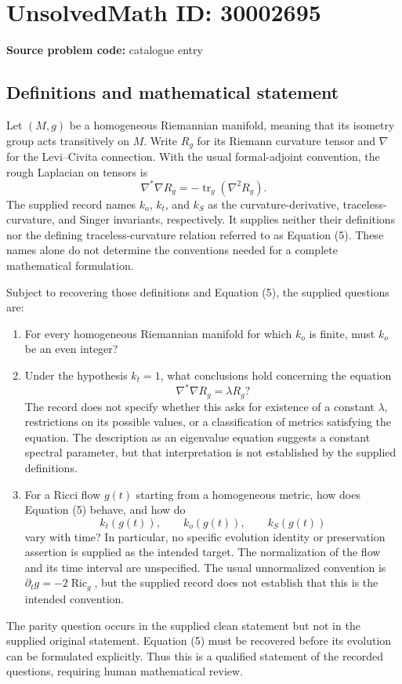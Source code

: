 \documentclass[11pt]{article}
\begin{document}
\section*{UnsolvedMath ID: 30002695}
\textbf{Source problem code:} catalogue entry
\subsection{Definitions and mathematical statement}
Let \((M,g)\) be a homogeneous Riemannian manifold, meaning that its isometry group acts transitively on \(M\). Write \(R_g\) for its Riemann curvature tensor and \(\nabla\) for the Levi--Civita connection. With the usual formal-adjoint convention, the rough Laplacian on tensors is
\[
\nabla^*\nabla R_g=-\operatorname{tr}_g(\nabla^2R_g).
\]
The supplied record names \(k_o\), \(k_t\), and \(k_S\) as the curvature-derivative, traceless-curvature, and Singer invariants, respectively. It supplies neither their definitions nor the defining traceless-curvature relation referred to as Equation (5). These names alone do not determine the conventions needed for a complete mathematical formulation.

Subject to recovering those definitions and Equation (5), the supplied questions are:
\begin{enumerate}
\item For every homogeneous Riemannian manifold for which \(k_o\) is finite, must \(k_o\) be an even integer?
\item Under the hypothesis \(k_t=1\), what conclusions hold concerning the equation
\[
\nabla^*\nabla R_g=\lambda R_g?
\]
The record does not specify whether this asks for existence of a constant \(\lambda\), restrictions on its possible values, or a classification of metrics satisfying the equation. The description as an eigenvalue equation suggests a constant spectral parameter, but that interpretation is not established by the supplied definitions.
\item For a Ricci flow \(g(t)\) starting from a homogeneous metric, how does Equation (5) behave, and how do
\[
k_t(g(t)),\qquad k_o(g(t)),\qquad k_S(g(t))
\]
vary with time? In particular, no specific evolution identity or preservation assertion is supplied as the intended target. The normalization of the flow and its time interval are unspecified. The usual unnormalized convention is \(\partial_tg=-2\operatorname{Ric}_g\), but the supplied record does not establish that this is the intended convention.
\end{enumerate}
The parity question occurs in the supplied clean statement but not in the supplied original statement. Equation (5) must be recovered before its evolution can be formulated explicitly. Thus this is a qualified statement of the recorded questions, requiring human mathematical review.
\end{document}
